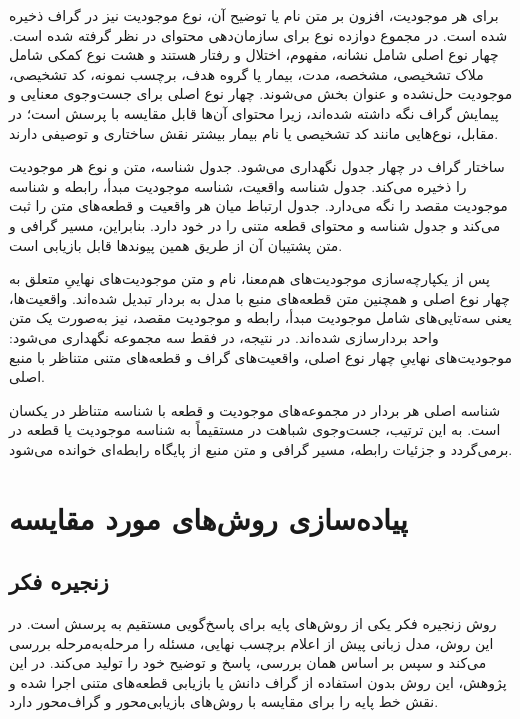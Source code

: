 برای هر موجودیت، افزون بر متن نام یا توضیح آن، نوع موجودیت نیز در گراف ذخیره شده است. در مجموع دوازده نوع برای سازمان‌دهی محتوای  در نظر گرفته شده است. چهار نوع اصلی شامل نشانه، مفهوم، اختلال و رفتار هستند و هشت نوع کمکی شامل ملاک تشخیصی، مشخصه، مدت، بیمار یا گروه هدف، برچسب نمونه، کد تشخیصی، موجودیت حل‌نشده و عنوان بخش می‌شوند. چهار نوع اصلی برای جست‌وجوی معنایی و پیمایش گراف نگه داشته شده‌اند، زیرا محتوای آن‌ها قابل مقایسه با پرسش است؛ در مقابل، نوع‌هایی مانند کد تشخیصی یا نام بیمار بیشتر نقش ساختاری و توصیفی دارند.

ساختار گراف در چهار جدول  نگهداری می‌شود. جدول  شناسه، متن و نوع هر موجودیت را ذخیره می‌کند. جدول  شناسه واقعیت، شناسه موجودیت مبدأ، رابطه و شناسه موجودیت مقصد را نگه می‌دارد. جدول  ارتباط میان هر واقعیت و قطعه‌های متن را ثبت می‌کند و جدول  شناسه و محتوای قطعه متنی را در خود دارد. بنابراین، مسیر گرافی و متن پشتیبان آن از طریق همین پیوندها قابل بازیابی است.

پس از یکپارچه‌سازی موجودیت‌های هم‌معنا، نام و متن موجودیت‌های نهاییِ متعلق به چهار نوع اصلی و همچنین متن قطعه‌های منبع با مدل  به بردار تبدیل شده‌اند. واقعیت‌ها، یعنی سه‌تایی‌های شامل موجودیت مبدأ، رابطه و موجودیت مقصد، نیز به‌صورت یک متن واحد بردارسازی شده‌اند. در نتیجه، در  فقط سه مجموعه نگهداری می‌شود: موجودیت‌های نهاییِ چهار نوع اصلی، واقعیت‌های گراف و قطعه‌های متنی متناظر با منبع اصلی.

شناسه اصلی هر بردار در مجموعه‌های موجودیت و قطعه با شناسه متناظر در  یکسان است. به این ترتیب، جست‌وجوی شباهت در  مستقیماً به شناسه موجودیت یا قطعه در  برمی‌گردد و جزئیات رابطه، مسیر گرافی و متن منبع از پایگاه رابطه‌ای خوانده می‌شود.

\section{پیاده‌سازی روش‌های مورد مقایسه}
\mbox{}\par

\subsection{زنجیره فکر }

روش زنجیره فکر یکی از روش‌های پایه برای پاسخ‌گویی مستقیم به پرسش است. در این روش، مدل زبانی پیش از اعلام برچسب نهایی، مسئله را مرحله‌به‌مرحله بررسی می‌کند و سپس بر اساس همان بررسی، پاسخ و توضیح خود را تولید می‌کند. در این پژوهش، این روش بدون استفاده از گراف دانش یا بازیابی قطعه‌های متنی اجرا شده و نقش خط پایه را برای مقایسه با روش‌های بازیابی‌محور و گراف‌محور دارد.

